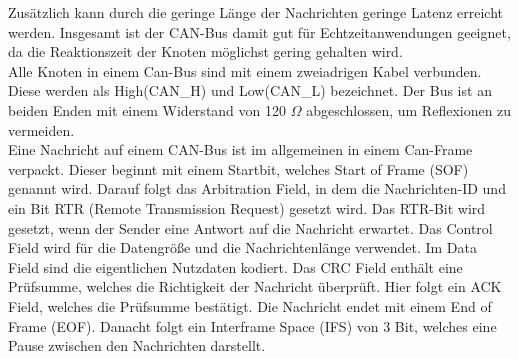 Zusätzlich kann durch die geringe Länge der Nachrichten geringe Latenz erreicht werden. 
Insgesamt ist der CAN-Bus damit gut für Echtzeitanwendungen geeignet, da die Reaktionszeit der Knoten möglichst gering gehalten wird.
\cite[Seiten 13-19]{Voss2008}
\\
Alle Knoten in einem Can-Bus sind mit einem zweiadrigen Kabel verbunden. Diese werden als High(CAN\_H) und Low(CAN\_L) 
bezeichnet. Der Bus ist an beiden Enden mit einem Widerstand von 120 $\Omega$ abgeschlossen, um Reflexionen zu vermeiden.
\cite[Seite 132]{Voss2008}
\\
Eine Nachricht auf einem CAN-Bus ist im allgemeinen in einem Can-Frame verpackt. Dieser beginnt
mit einem Startbit, welches Start of Frame (SOF) genannt wird. Darauf folgt das Arbitration Field, 
in dem die Nachrichten-ID und ein Bit RTR (Remote Transmission Request) gesetzt wird. Das RTR-Bit wird gesetzt,
wenn der Sender eine Antwort auf die Nachricht erwartet. Das Control Field wird für die Datengröße und die Nachrichtenlänge
verwendet. Im Data Field sind die eigentlichen Nutzdaten kodiert. Das CRC Field enthält eine Prüfsumme, welches die Richtigkeit
der Nachricht überprüft. Hier folgt ein ACK Field, welches die Prüfsumme bestätigt. Die Nachricht endet mit einem End of Frame (EOF).
Danacht folgt ein Interframe Space (IFS) von 3 Bit, welches eine Pause zwischen den Nachrichten darstellt.
\cite[Seite 36]{Voss2008}

